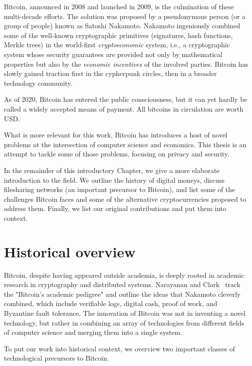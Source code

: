 Bitcoin, announced in 2008 and launched in 2009, is the culmination of these multi-decade efforts.
The solution was proposed by a pseudonymous person (or a group of people) known as Satoshi Nakamoto.
Nakamoto ingeniously combined some of the well-known cryptographic primitives (signatures, hash functions, Merkle trees) in the world-first \textit{cryptoeconomic} system, i.e., a cryptographic system whose security guarantees are provided not only by mathematical properties but also by the \textit{economic incentives} of the involved parties.
Bitcoin has slowly gained traction first in the cypherpunk circles, then in a broader technology community.

As of 2020, Bitcoin has entered the public consciousness, but it can yet hardly be called a widely accepted means of payment.
All bitcoins in circulation are worth  USD.

What is more relevant for this work, Bitcoin has introduces a host of novel problems at the intersection of computer science and economics.
This thesis is an attempt to tackle some of those problems, focusing on privacy and security.

In the remainder of this introductory Chapter, we give a more elaborate introduction to the field.
We outline the history of digital moneys, discuss filesharing networks (an important precursor to Bitcoin), and list some of the challenges Bitcoin faces and some of the alternative cryptocurrencies proposed to address them.
Finally, we list our original contributions and put them into context.


\section{Historical overview}

Bitcoin, despite having appeared outside academia, is deeply rooted in academic research in cryptography and distributed systems.
Narayanan and Clark~\cite{Narayanan2017} track the "Bitcoin's academic pedigree" and outline the ideas that Nakamoto cleverly combined, which include verifiable logs, digital cash, proof of work, and Byzantine fault tolerance.
The innovation of Bitcoin was not in inventing a novel technology, but rather in combining an array of technologies from different fields of computer science and merging them into a single system.

To put our work into historical context, we overview two important classes of technological precursors to Bitcoin.


